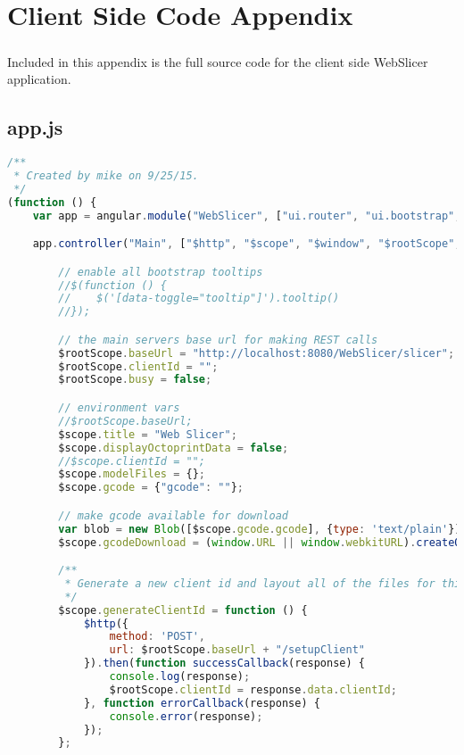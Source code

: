 \chapter{Client Side Code Appendix}
\paragraph{}
Included in this appendix is the full source code for the client side WebSlicer application.


\section{app.js}
\begin{lstlisting}[language=JavaScript, label={lst:app}, caption=Main app code where the angular module WebSlicer is defined. This is similar to a main function in C++.]
/**
 * Created by mike on 9/25/15.
 */
(function () {
    var app = angular.module("WebSlicer", ["ui.router", "ui.bootstrap", "ngAnimate", "ngFileUpload"]);

    app.controller("Main", ["$http", "$scope", "$window", "$rootScope", function ($http, $scope, $window, $rootScope) {

        // enable all bootstrap tooltips
        //$(function () {
        //    $('[data-toggle="tooltip"]').tooltip()
        //});

        // the main servers base url for making REST calls
        $rootScope.baseUrl = "http://localhost:8080/WebSlicer/slicer";
        $rootScope.clientId = "";
        $rootScope.busy = false;

        // environment vars
        //$rootScope.baseUrl;
        $scope.title = "Web Slicer";
        $scope.displayOctoprintData = false;
        //$scope.clientId = "";
        $scope.modelFiles = {};
        $scope.gcode = {"gcode": ""};

        // make gcode available for download
        var blob = new Blob([$scope.gcode.gcode], {type: 'text/plain'});
        $scope.gcodeDownload = (window.URL || window.webkitURL).createObjectURL(blob);

        /**
         * Generate a new client id and layout all of the files for this new client on the server
         */
        $scope.generateClientId = function () {
            $http({
                method: 'POST',
                url: $rootScope.baseUrl + "/setupClient"
            }).then(function successCallback(response) {
                console.log(response);
                $rootScope.clientId = response.data.clientId;
            }, function errorCallback(response) {
                console.error(response);
            });
        };


\end{lstlisting}
